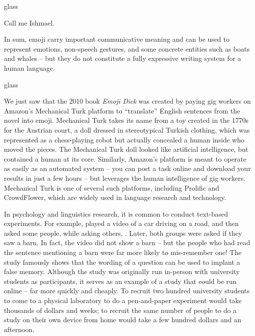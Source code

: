 \begin{tblsfilledsymbol}{}{glass}
\begin{underthehood}
 \ea \ea  Call me Ishmael.
    \ex \label{emojib} \telephone \beardman \sailboat \whale \okayhand 
\z
\z


In sum, emoji carry important communicative meaning and can be used to represent emotions, non-speech gestures, and some concrete entities such as boats and whales -- but they do not constitute a fully expressive writing system for a human language.


\end{underthehood}
\end{tblsfilledsymbol}



\begin{tblsfilledsymbol}{}{glass}
 \begin{underthehood}

We just saw that the 2010 book \emph{Emoji Dick} was created by paying gig workers on Amazon's Mechanical Turk platform to ``translate'' English sentences from the novel into emoji.    Mechanical Turk takes its name from a toy created in the 1770s for the Austrian court, a doll dressed in  stereotypical Turkish clothing, which was represented as a chess-playing robot but actually concealed a human inside who moved the pieces.  The Mechanical Turk doll looked like artificial intelligence, but contained a human at its core.  Similarly, Amazon's platform is meant to operate as easily as an automated system -- you can post a task online and download your results in just a few hours -- but leverages the human intelligence of gig workers.  Mechanical Turk is one of several such platforms, including Prolific and CrowdFlower, which are widely used in language research and technology.

\newpage
In psychology and linguistics research, it is common to conduct text-based experiments.  For example, \citet{Loftus:1975} played a video of a car driving on a road, and then asked some people,  while asking others, .   Later, both groups were asked if they saw a barn.  In fact, the video did not show a barn -- but the people who had read the sentence mentioning a barn were far more likely to mis-remember one!  The study famously shows that the wording of a question can be used to implant a false memory.  Although the study was originally run in-person with university students as participants, it serves as an example of a study that could be run online -- far more quickly and cheaply.  To recruit two hundred university students to come to a physical laboratory to do a pen-and-paper experiment would take thousands of dollars and weeks; to recruit the same number of people to do a study on their own device from home would take a few hundred dollars and an afternoon.


\end{underthehood}
\end{tblsfilledsymbol}
